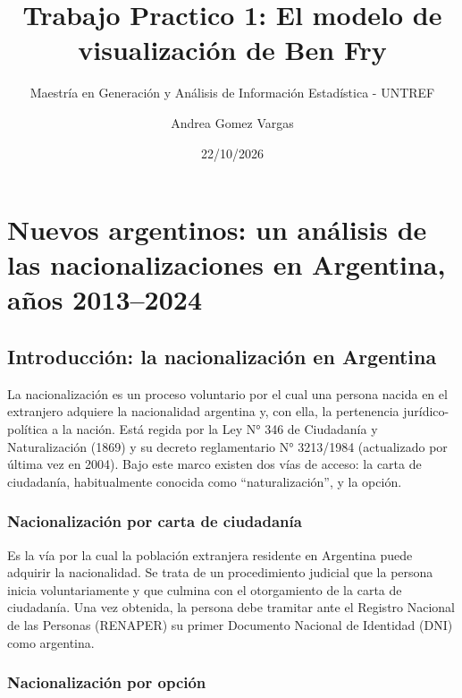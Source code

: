 \documentclass[
  letterpaper,
  DIV=11,
  numbers=noendperiod]{scrartcl}
\title{Trabajo Practico 1: El modelo de visualización de Ben Fry}
\subtitle{Maestría en Generación y Análisis de Información Estadística -
UNTREF}
\author{Andrea Gomez Vargas}
\date{22/10/2026}
\renewcommand*\contentsname{Tabla de contenidos}
\newcommand\contentsname{Tabla de contenidos}
\begin{document}
\maketitle

\renewcommand*\contentsname{Tabla de contenidos}
{
\setcounter{tocdepth}{3}
\tableofcontents
}

\newpage

\section{Nuevos argentinos: un análisis de las nacionalizaciones en
Argentina, años
2013--2024}\label{nuevos-argentinos-un-anuxe1lisis-de-las-nacionalizaciones-en-argentina-auxf1os-20132024}

\subsection{Introducción: la nacionalización en
Argentina}\label{introducciuxf3n-la-nacionalizaciuxf3n-en-argentina}

La nacionalización es un proceso voluntario por el cual una persona
nacida en el extranjero adquiere la nacionalidad argentina y, con ella,
la pertenencia jurídico-política a la nación. Está regida por la Ley N°
346 de Ciudadanía y Naturalización (1869) y su decreto reglamentario N°
3213/1984 (actualizado por última vez en 2004). Bajo este marco existen
dos vías de acceso: la carta de ciudadanía, habitualmente conocida como
``naturalización'', y la opción.

\subsubsection{Nacionalización por carta de
ciudadanía}\label{nacionalizaciuxf3n-por-carta-de-ciudadanuxeda}

Es la vía por la cual la población extranjera residente en Argentina
puede adquirir la nacionalidad. Se trata de un procedimiento judicial
que la persona inicia voluntariamente y que culmina con el otorgamiento
de la carta de ciudadanía. Una vez obtenida, la persona debe tramitar
ante el Registro Nacional de las Personas (RENAPER) su primer Documento
Nacional de Identidad (DNI) como argentina.

\subsubsection{Nacionalización por
opción}\label{nacionalizaciuxf3n-por-opciuxf3n}
\end{document}
